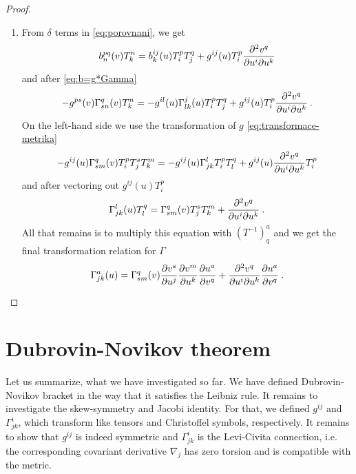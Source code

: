 \begin{proof}
\begin{enumerate}
        \item From $\delta$ terms in \eqref{eq:porovnani}, we get
        \begin{align}
            b^{pq}_n(v) T^n_k =
            b^{ij}_k(u) T^p_i T^q_j + g^{ij}(u) T^p_i \frac{\partial^2 v^q}{\partial u^i \partial u^k}
        \end{align}
        and after \eqref{eq:b=g*Gamma}
        \begin{align}
            - g^{ps}(v) \Gamma^{q}_{sn}(v) T^n_k =
            - g^{il}(u) \Gamma^j_{lk}(u) T^p_i T^q_j + g^{ij}(u) T^p_i \frac{\partial^2 v^q}{\partial u^i \partial u^k} \:.
        \end{align}
        On the left-hand side we use the transformation of $g$ \eqref{eq:transformace-metrika}
        \begin{align}
            -g^{ij}(u) \Gamma^q_{sm}(v) T^p_i T^s_j T^m_k = - g^{ij}(u) \Gamma^l_{jk} T^p_i T^q_l + g^{ij}(u) \frac{\partial^2 v^q}{\partial u^i \partial u^k} T^p_i 
        \end{align}
        and after vectoring out $g^{ij}(u) T^p_i$
        \begin{align}
            \Gamma^l_{jk}(u) T^q_l = \Gamma^q_{sm}(v) T^s_j T^m_k + \frac{\partial^2 v^q}{\partial u^i \partial u^k} \:.
        \end{align}
        All that remains is to multiply this equation with $(T^{-1})^a_q$ and we get the final transformation relation for $\Gamma$
        \begin{align}
            \Gamma^a_{jk}(u) = \Gamma^q_{sm}(v) \frac{\partial v^s}{\partial u^j} \frac{\partial v^m}{\partial u^k} \frac{\partial u^a}{\partial v^q} + \frac{\partial^2 v^q}{\partial u^i \partial u^k} \frac{\partial u^a}{\partial v^q} \:.
        \end{align}
    \end{enumerate}
\end{proof}



\section{Dubrovin-Novikov theorem}

Let us summarize, what we have investigated so far. We have defined Dubrovin-Novikov bracket in the way that it satisfies the Leibniz rule. It remains to investigate the skew-symmetry and Jacobi identity. For that, we defined $g^{ij}$ and $\Gamma^i_{jk}$, which transform like tensors and Christoffel symbols, respectively. It remains to show that $g^{ij}$ is indeed symmetric and $\Gamma^i_{jk}$ is the Levi-Civita connection, i.e. the corresponding covariant derivative $\nabla_j$ has zero torsion and is compatible with the metric.

